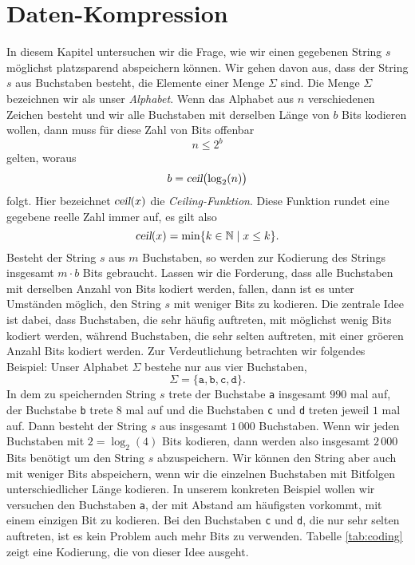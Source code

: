 \chapter{Daten-Kompression}
In diesem Kapitel untersuchen wir die Frage, wie wir einen gegebenen String $s$ m\"oglichst platzsparend
abspeichern k\"onnen.  Wir gehen davon aus, dass der String $s$ aus Buchstaben besteht, die 
Elemente einer Menge $\Sigma$ sind.  Die Menge $\Sigma$ bezeichnen wir als unser \emph{Alphabet}. 
Wenn das Alphabet aus $n$ verschiedenen Zeichen besteht und wir alle Buchstaben mit derselben L\"ange
von $b$ Bits kodieren wollen, dann muss f\"ur diese Zahl von Bits offenbar
\[ n \leq 2^b \] 
gelten, woraus
\[ b = \textsl{ceil}\bigl(\log_2(n)\bigr) \]
folgt.  Hier bezeichnet $\textsl{ceil}(x)$ die \emph{Ceiling-Funktion}.  Diese Funktion
rundet eine gegebene reelle Zahl immer auf, es gilt also
\[ \textsl{ceil}(x) = \min \{ k \in {\mathbb N} \mid x \leq k \}. \]
Besteht der String $s$ aus $m$ Buchstaben, so werden zur Kodierung des Strings insgesamt
$m \cdot b$ Bits gebraucht.  Lassen wir die Forderung, dass alle Buchstaben mit derselben
Anzahl von Bits kodiert werden, fallen, dann ist es unter Umst\"anden m\"oglich, den String
$s$ mit weniger Bits zu kodieren.  Die zentrale Idee ist dabei, dass Buchstaben, die sehr
h\"aufig auftreten, mit m\"oglichst wenig Bits kodiert werden, w\"ahrend Buchstaben, die sehr selten
auftreten, mit einer gr\"o\3eren Anzahl Bits kodiert werden.  Zur Verdeutlichung betrachten
wir folgendes Beispiel:  Unser Alphabet  $\Sigma$ bestehe nur aus vier Buchstaben,
\[ \Sigma = \{ \mathtt{a}, \mathtt{b}, \mathtt{c}, \texttt{d} \}. \]
In dem zu speichernden String $s$ trete der Buchstabe \texttt{a} insgesamt $990$ mal auf, der
Buchstabe \texttt{b} trete $8$ mal auf und die Buchstaben \texttt{c} und \texttt{d} treten
jeweil $1$ mal auf.  Dann besteht der String $s$ aus insgesamt $1\,000$ 
Buchstaben.  Wenn wir jeden Buchstaben mit $2 = \log_2(4)$ Bits kodieren, dann werden also
insgesamt $2\,000$ Bits ben\"otigt um den String $s$ abzuspeichern.  Wir k\"onnen den String
aber auch mit weniger Bits abspeichern, wenn wir die einzelnen Buchstaben mit Bitfolgen
unterschiedlicher L\"ange kodieren.   In unserem konkreten
Beispiel wollen wir versuchen den Buchstaben \texttt{a}, der mit Abstand am h\"aufigsten
vorkommt, mit einem einzigen Bit zu kodieren.  Bei den  Buchstaben
\texttt{c} und \texttt{d}, die nur sehr selten auftreten, ist es kein Problem auch mehr
Bits zu verwenden.  Tabelle \ref{tab:coding} zeigt eine Kodierung, die von dieser Idee
ausgeht. 

